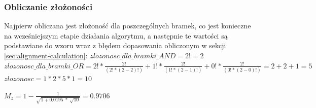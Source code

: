 \subsubsection{Obliczanie złożoności}
Najpierw obliczana jest złożoność dla poszczególnych bramek, co jest konieczne na wcześniejszym etapie działania algorytmu, a następnie te wartości są podstawiane do wzoru wraz z błędem dopasowania obliczonym w sekcji \ref{sec:alignment-calculation}:\newline
$zlozonosc\_dla\_bramki\_AND = 2! = 2$\newline
$zlozonosc\_dla\_bramki\_OR = 2! * \frac{2!}{(2! * (2 - 2)!)} + 1! *  \frac{2!}{(1! * (2 - 1)!)} + 0! * \frac{2!}{(0! * (2 - 0)!)} = 2 + 2 + 1 = 5$\newline
$zlozonosc = 1 * 2 * 5 * 1 = 10$
\begin{center}
$M_z = 1 - \frac{1}{\sqrt{1 + 0.0195\ *\ \sqrt{10}}} = 0.9706$
\end{center}